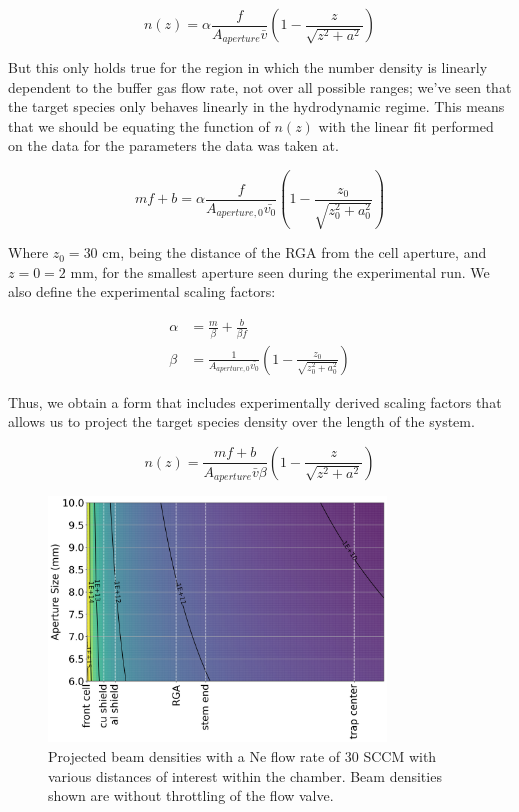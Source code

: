 \begin{equation*}
	n(z) = \alpha\frac{f}{A_{aperture} \bar{v}}\left(1-\frac{z}{\sqrt{z^2+a^2}}\right)
\end{equation*}

But this only holds true for the region in which the number density is linearly dependent to the buffer gas flow rate, not over all possible ranges; we've seen that the target species only behaves linearly in the hydrodynamic regime. This means that we should be equating the function of $n(z)$ with the linear fit performed on the data for the parameters the data was taken at.

\begin{equation*}
	mf+b = \alpha\frac{f}{A_{aperture, 0} \bar{v_0}}\left(1-\frac{z_0}{\sqrt{z_0^2+a_0^2}}\right) 
\end{equation*}

Where $z_0=30$ cm, being the distance of the RGA from the cell aperture, and $z=0=2$ mm, for the smallest aperture seen during the experimental run. We also define the experimental scaling factors:

\begin{align*}
	\alpha & = \frac{m}{\beta}+\frac{b}{\beta f} \\
	\beta & = \frac{1}{A_{aperture, 0} \bar{v_0}}\left(1-\frac{z_0}{\sqrt{z_0^2+a_0^2}}\right)
\end{align*}

Thus, we obtain a form that includes experimentally derived scaling factors that allows us to project the target species density over the length of the system.

\begin{equation}
	n(z) = \frac{mf+b}{A_{aperture} \bar{v} \beta}\left(1-\frac{z}{\sqrt{z^2+a^2}}\right)
	\label{eq: experimental n(z)}
\end{equation}

\begin{figure}[H]
	\centering
	\includegraphics[width=0.8\textwidth]{images/CBGB_beam_density_over_system.png}
	\caption{Projected beam densities with a Ne flow rate of 30 SCCM with various distances of interest within the chamber. Beam densities shown are without throttling of the  flow valve.}
	\label{fig: beam_density}
\end{figure}

